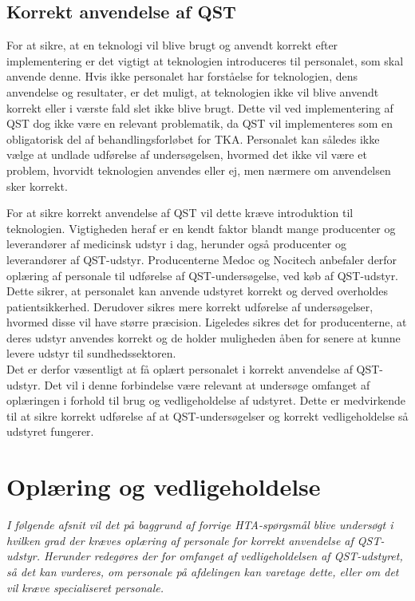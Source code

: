 \subsection{Korrekt anvendelse af QST}
For at sikre, at en teknologi vil blive brugt og anvendt korrekt efter implementering er det vigtigt at teknologien introduceres til personalet, som skal anvende denne. Hvis ikke personalet har forståelse for teknologien, dens anvendelse og resultater, er det muligt, at teknologien ikke vil blive anvendt korrekt eller i værste fald slet ikke blive brugt. Dette vil ved implementering af QST dog ikke være en relevant problematik, da QST vil implementeres som en obligatorisk del af behandlingsforløbet for TKA. Personalet kan således ikke vælge at undlade udførelse af undersøgelsen, hvormed det ikke vil være et problem, hvorvidt teknologien anvendes eller ej, men nærmere om anvendelsen sker korrekt. 

For at sikre korrekt anvendelse af QST vil dette kræve introduktion til teknologien. Vigtigheden heraf er en kendt faktor blandt mange producenter og leverandører af medicinsk udstyr i dag, herunder også producenter og leverandører af QST-udstyr. Producenterne Medoc og Nocitech anbefaler derfor oplæring af personale til udførelse af QST-undersøgelse, ved køb af QST-udstyr. Dette sikrer, at personalet kan anvende udstyret korrekt og derved overholdes patientsikkerhed. Derudover sikres mere korrekt udførelse af undersøgelser, hvormed disse vil have større præcision. Ligeledes sikres det for producenterne, at deres udstyr anvendes korrekt og de holder muligheden åben for senere at kunne levere udstyr til sundhedssektoren. \\
Det er derfor væsentligt at få oplært personalet i korrekt anvendelse af QST-udstyr. Det vil i denne forbindelse være relevant at undersøge omfanget af oplæringen i forhold til brug og vedligeholdelse af udstyret. Dette er medvirkende til at sikre korrekt udførelse af at QST-undersøgelser og korrekt vedligeholdelse så udstyret fungerer.
\section{Oplæring og vedligeholdelse}
\textit{I følgende afsnit vil det på baggrund af forrige HTA-spørgsmål blive undersøgt i hvilken grad der kræves oplæring af personale for korrekt anvendelse af QST-udstyr. Herunder redegøres der for omfanget af vedligeholdelsen af QST-udstyret, så det kan vurderes, om personale på afdelingen kan varetage dette, eller om det vil kræve specialiseret personale.}


